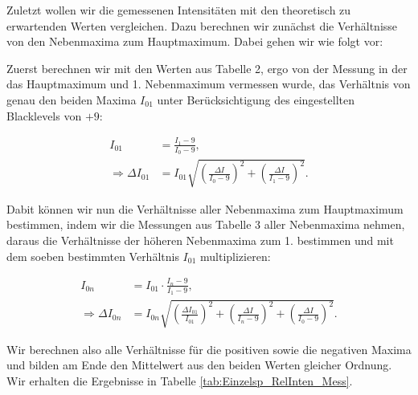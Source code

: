 \documentclass{article}
\begin{document}
Zuletzt wollen wir die gemessenen Intensitäten mit den theoretisch zu erwartenden Werten vergleichen. Dazu berechnen wir zunächst die Verhältnisse von den Nebenmaxima zum Hauptmaximum. Dabei gehen wir wie folgt vor:

Zuerst berechnen wir mit den Werten aus Tabelle 2, ergo von der Messung in der das Hauptmaximum und 1. Nebenmaximum vermessen wurde, das Verhältnis von genau den beiden Maxima $I_{01}$ unter Berücksichtigung des eingestellten Blacklevels von $+9$:

\begin{equation}
    \begin{split}
        I_{01} &= \frac{I_1 - 9}{I_0 - 9}, \\
        \Rightarrow \Delta I_{01} &= I_{01} \sqrt{\left( \frac{\Delta I}{I_0 - 9} \right)^2 + \left( \frac{\Delta I}{I_1 - 9} \right)^2}.
    \end{split}
\end{equation}

Dabit können wir nun die Verhältnisse aller Nebenmaxima zum Hauptmaximum bestimmen, indem wir die Messungen aus Tabelle 3 aller Nebenmaxima nehmen, daraus die Verhältnisse der höheren Nebenmaxima zum 1. bestimmen und mit dem soeben bestimmten Verhältnis $I_{01}$  multiplizieren:

\begin{equation}
    \begin{split}
        I_{0n} &= I_{01} \cdot \frac{I_n - 9}{I_1 - 9}, \\
        \Rightarrow \Delta I_{0n} &= I_{0n} \sqrt{\left( \frac{\Delta I_{01}}{I_{01}} \right)^2 + \left( \frac{\Delta I}{I_n - 9} \right)^2 + \left( \frac{\Delta I}{I_0 - 9} \right)^2}.
    \end{split}
\end{equation}

Wir berechnen also alle Verhältnisse für die positiven sowie die negativen Maxima  und bilden am Ende den Mittelwert aus den beiden Werten gleicher Ordnung. Wir erhalten die Ergebnisse in Tabelle \ref{tab:Einzelsp_RelInten_Mess}.
\end{document}
